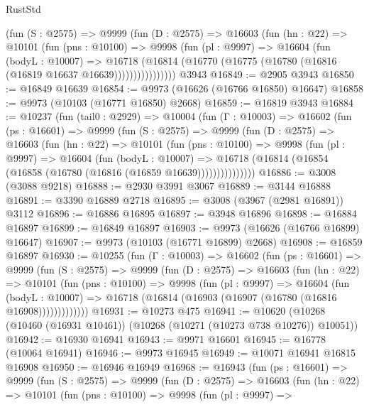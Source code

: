 \begin{lexlean}{RustStd}
\begin{coremodule}
            (fun (S : @2575) =>
            @9999
              (fun (D : @2575) =>
              @16603
                (fun (hn : @22) =>
                @10101
                  (fun (pns : @10100) =>
                  @9998
                    (fun (pl : @9997) =>
                    @16604
                      (fun (bodyL : @10007) =>
                      @16718
                        (@16814
                          (@16770 (@16775 (@16780 (@16816 (@16819 @16637 @16639))))))))))))))))
    @3943
@16849 := @2905 @3943
@16850 := @16849 @16639
@16854 := @9973 (@16626 (@16766 @16850) @16647)
@16858 := @9973 (@10103 (@16771 @16850) @2668)
@16859 := @16819 @3943
@16884 := @10237
    (fun (tail0 : @2929) =>
    @10004
      (fun (Γ : @10003) =>
      @16602
        (fun (ps : @16601) =>
        @9999
          (fun (S : @2575) =>
          @9999
            (fun (D : @2575) =>
            @16603
              (fun (hn : @22) =>
              @10101
                (fun (pns : @10100) =>
                @9998
                  (fun (pl : @9997) =>
                  @16604
                    (fun (bodyL : @10007) =>
                    @16718 (@16814 (@16854 (@16858 (@16780 (@16816 (@16859 @16639)))))))))))))))
@16886 := @3008 (@3088 @9218)
@16888 := @2930 @3991 @3067
@16889 := @3144 @16888
@16891 := @3390 @16889 @2718
@16895 := @3008 (@3967 (@2981 @16891)) @3112
@16896 := @16886 @16895
@16897 := @3948 @16896
@16898 := @16884 @16897
@16899 := @16849 @16897
@16903 := @9973 (@16626 (@16766 @16899) @16647)
@16907 := @9973 (@10103 (@16771 @16899) @2668)
@16908 := @16859 @16897
@16930 := @10255
    (fun (Γ : @10003) =>
    @16602
      (fun (ps : @16601) =>
      @9999
        (fun (S : @2575) =>
        @9999
          (fun (D : @2575) =>
          @16603
            (fun (hn : @22) =>
            @10101
              (fun (pns : @10100) =>
              @9998
                (fun (pl : @9997) =>
                @16604
                  (fun (bodyL : @10007) =>
                  @16718 (@16814 (@16903 (@16907 (@16780 (@16816 @16908)))))))))))))
@16931 := @10273 @475
@16941 := @10620 (@10268 (@10460 (@16931 @10461)) (@10268 (@10271 (@10273 @738 @10276)) @10051))
@16942 := @16930 @16941
@16943 := @9971 @16601
@16945 := @16778 (@10064 @16941)
@16946 := @9973 @16945
@16949 := @10071 @16941 @16815 @16908
@16950 := @16946 @16949
@16968 := @16943
    (fun (ps : @16601) =>
    @9999
      (fun (S : @2575) =>
      @9999
        (fun (D : @2575) =>
        @16603
          (fun (hn : @22) =>
          @10101
            (fun (pns : @10100) =>
            @9998
              (fun (pl : @9997) =>

\end{coremodule}
\end{lexlean}
